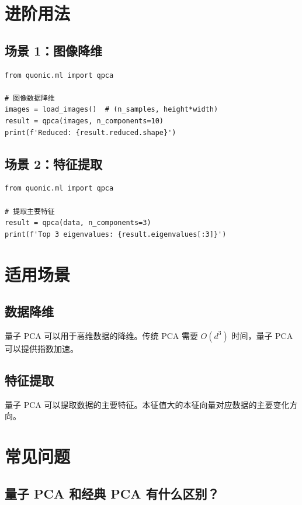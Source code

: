 \documentclass[12pt,a4paper]{article}
\begin{document}
\section{进阶用法}

\subsection{场景 1：图像降维}

\begin{verbatim}
from quonic.ml import qpca

# 图像数据降维
images = load_images()  # (n_samples, height*width)
result = qpca(images, n_components=10)
print(f'Reduced: {result.reduced.shape}')
\end{verbatim}

\subsection{场景 2：特征提取}

\begin{verbatim}
from quonic.ml import qpca

# 提取主要特征
result = qpca(data, n_components=3)
print(f'Top 3 eigenvalues: {result.eigenvalues[:3]}')
\end{verbatim}

\section{适用场景}

\subsection{数据降维}

量子 PCA 可以用于高维数据的降维。传统 PCA 需要 $O(d^3)$ 时间，量子 PCA 可以提供指数加速。

\subsection{特征提取}

量子 PCA 可以提取数据的主要特征。本征值大的本征向量对应数据的主要变化方向。

\section{常见问题}

\subsection{量子 PCA 和经典 PCA 有什么区别？}
\end{document}
